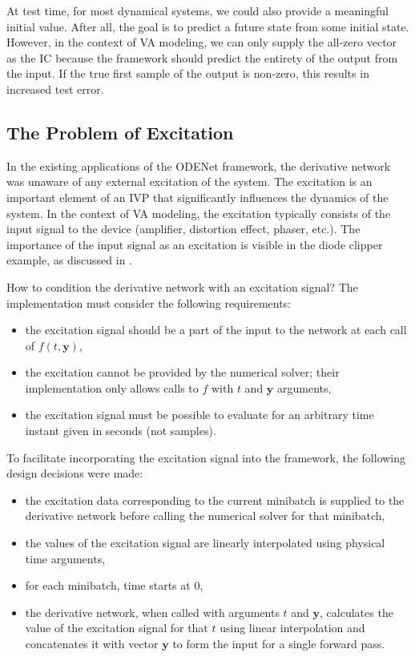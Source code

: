 At test time, for most dynamical systems, we could also provide a meaningful initial value. After all, the goal is to predict a future state from some initial state. However, in the context of \ac{VA} modeling, we can only supply the all-zero vector as the \ac{IC} because the framework should predict the entirety of the output from the input. If the true first sample of the output is non-zero, this results in increased test error.

\subsection{The Problem of Excitation}
\label{subsec:excitation}

In the existing applications of the ODENet framework, the derivative network was unaware of any external excitation of the system. The excitation is an important element of an \ac{IVP} that significantly influences the dynamics of the system. In the context of \ac{VA} modeling, the excitation typically consists of the input signal to the device (amplifier, distortion effect, phaser, etc.). The importance of the input signal as an excitation is visible in the diode clipper example, as discussed in .

How to condition the derivative network with an excitation signal? The implementation must consider the following requirements:
\begin{itemize}
  \item the excitation signal should be a part of the input to the network at each call of $f(t, \pmb{y})$,
  \item the excitation cannot be provided by the numerical solver; their implementation only allows calls to $f$ with $t$ and $\pmb{y}$ arguments,
  \item the excitation signal must be possible to evaluate for an arbitrary time instant given in seconds (not samples).
\end{itemize}

To facilitate incorporating the excitation signal into the framework, the following design decisions were made:
\begin{itemize}
  \item the excitation data corresponding to the current minibatch is supplied to the derivative network before calling the numerical solver for that minibatch,
  \item the values of the excitation signal are linearly interpolated using physical time arguments,
  \item for each minibatch, time starts at 0,
  \item the derivative network, when called with arguments $t$ and $\pmb{y}$, calculates the value of the excitation signal for that $t$ using linear interpolation and concatenates it with vector $\pmb{y}$ to form the input for a single forward pass.
\end{itemize}

